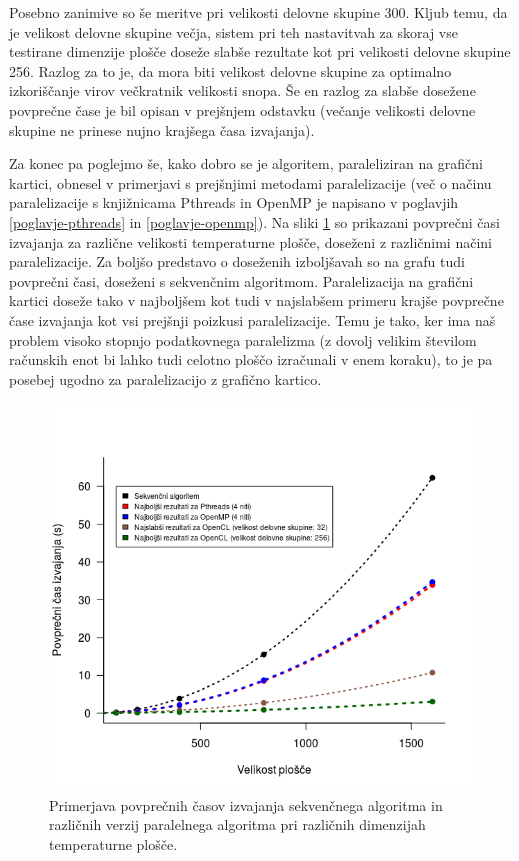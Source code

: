 \documentclass[a4paper,titlepage,11pt]{article}
\begin{document}
Posebno zanimive so še meritve pri velikosti delovne skupine 300. Kljub temu, da je velikost delovne skupine večja, sistem pri teh nastavitvah za skoraj vse testirane dimenzije plošče doseže slabše rezultate kot pri velikosti delovne skupine 256. Razlog za to je, da mora biti velikost delovne skupine za optimalno izkoriščanje virov večkratnik velikosti snopa. Še en razlog za slabše dosežene povprečne čase je bil opisan v prejšnjem odstavku (večanje velikosti delovne skupine ne prinese nujno krajšega časa izvajanja).

Za konec pa poglejmo še, kako dobro se je algoritem, paraleliziran na grafični kartici, obnesel v primerjavi s prejšnjimi metodami paralelizacije (več o načinu paralelizacije s knjižnicama Pthreads in OpenMP je napisano v poglavjih \ref{poglavje-pthreads} in \ref{poglavje-openmp}). Na sliki \ref{graf-rezultati-primerjava-4} so prikazani povprečni časi izvajanja za različne velikosti temperaturne plošče, doseženi z različnimi načini paralelizacije. Za boljšo predstavo o doseženih izboljšavah so na grafu tudi povprečni časi, doseženi s sekvenčnim algoritmom. Paralelizacija na grafični kartici doseže tako v najboljšem kot tudi v najslabšem primeru krajše povprečne čase izvajanja kot vsi prejšnji poizkusi paralelizacije. Temu je tako, ker ima naš problem visoko stopnjo podatkovnega paralelizma (z dovolj velikim številom računskih enot bi lahko tudi celotno ploščo izračunali v enem koraku), to je pa posebej ugodno za paralelizacijo z grafično kartico.

\begin{figure}[H]
\begin{center}
\includegraphics[scale=0.7]{graf-rezultati-4_1_1.png}
\caption{Primerjava povprečnih časov izvajanja sekvenčnega algoritma in različnih verzij paralelnega algoritma pri različnih dimenzijah temperaturne plošče.}
\label{graf-rezultati-primerjava-4}
\end{center}
\vspace{-25pt}
\end{figure}
\end{document}
